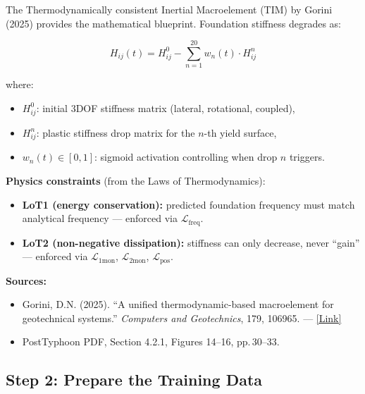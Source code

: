 \documentclass[11pt,a4paper]{article}
\begin{document}
The Thermodynamically consistent Inertial Macroelement (TIM) by Gorini (2025)
provides the mathematical blueprint. Foundation stiffness degrades as:

\begin{equation}
  H_{ij}(t) = H^0_{ij} - \sum_{n=1}^{20} w_n(t) \cdot H^n_{ij}
  \label{eq:stiffness_degradation}
\end{equation}

where:
\begin{itemize}[noitemsep]
  \item $H^0_{ij}$: initial 3DOF stiffness matrix (lateral, rotational, coupled),
  \item $H^n_{ij}$: plastic stiffness drop matrix for the $n$-th yield surface,
  \item $w_n(t) \in [0,1]$: sigmoid activation controlling when drop $n$ triggers.
\end{itemize}

\textbf{Physics constraints} (from the Laws of Thermodynamics):
\begin{itemize}[noitemsep]
  \item \textbf{LoT1 (energy conservation):} predicted foundation frequency must match
        analytical frequency --- enforced via $\mathcal{L}_{\text{freq}}$.
  \item \textbf{LoT2 (non-negative dissipation):} stiffness can only decrease, never
        ``gain'' --- enforced via $\mathcal{L}_{\text{1mon}}$, $\mathcal{L}_{\text{2mon}}$,
        $\mathcal{L}_{\text{pos}}$.
\end{itemize}

\textbf{Sources:}
\begin{itemize}[noitemsep]
  \item Gorini, D.N. (2025). ``A unified thermodynamic-based macroelement for
        geotechnical systems.'' \textit{Computers and Geotechnics}, 179, 106965.
        --- \href{https://www.sciencedirect.com/science/article/pii/S0266352X2200547X}{[Link]}
  \item PostTyphoon PDF, Section 4.2.1, Figures 14--16, pp.\,30--33.
\end{itemize}

\subsection{Step 2: Prepare the Training Data}
\end{document}
